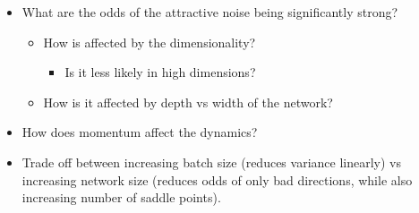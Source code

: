 \documentclass[11pt]{article}
\providecommand{\tightlist}{%
      \setlength{\itemsep}{0pt}\setlength{\parskip}{0pt}}
\begin{document}
\begin{itemize}
\tightlist
\item
  What are the odds of the attractive noise being significantly strong?

  \begin{itemize}
  \tightlist
  \item
    How is affected by the dimensionality?

    \begin{itemize}
    \tightlist
    \item
      Is it less likely in high dimensions?
    \end{itemize}
  \item
    How is it affected by depth vs width of the network?
  \end{itemize}
\item
  How does momentum affect the dynamics?
\item
  Trade off between increasing batch size (reduces variance linearly) vs
  increasing network size (reduces odds of only bad directions, while
  also increasing number of saddle points).
\end{itemize}


    
    
    
    
\end{document}
